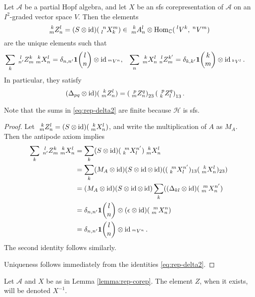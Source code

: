 \begin{Lem} \label{lemma:rep-corep} Let $\mathscr{A}$ be a partial Hopf algebra, and let $X$ be an sfs corepresentation of $\mathscr{A}$ on an $I^2$-graded vector space $V$.
  Then the elements %
  \[\Gr{Z}{k}{l}{m}{n} =(S \otimes
  \id)(\Gr{X}{n}{m}{l}{k}) \in
    \Gr{A}{k}{l}{m}{n} \otimes
    \Hom_\C(\Gru{V}{l}{k},\Gru{V}{n}{m})\] are the unique elements such  that
  \begin{align}\label{eq:rep-delta2}
    \sum_{k} \Gr{Z}{l}{k}{n'}{m} \Gr{X}{k}{l}{m}{n} &= \delta_{n,n'}
    \UnitC{l}{n} \otimes \id_{\Gru{V}{m}{n}}, &
    \sum_{n} \Gr{X}{k}{l}{m}{n} \Gr{Z}{l}{k'}{n}{m} &= \delta_{k,k'}
    \UnitC{k}{m}\otimes \id_{\Gru{V}{k}{l}}.
  \end{align}
   In particular, they satisfy
  \begin{align*}
    (\Delta_{pq} \otimes \id)(\Gr{Z}{k}{l}{m}{n}) &=
    \left(\Gr{Z}{p}{q}{m}{n}\right)_{23}\left(\Gr{Z}{p}{q}{k}{l}\right)_{13}.
  \end{align*}
\end{Lem}
Note that the sums in \eqref{eq:rep-delta2} are finite because $\mathcal{H}$ is sfs. 
\begin{proof}
 Let  $\Gr{Z}{k}{l}{m}{n}=(S \otimes \id)(\Gr{X}{k}{l}{m}{n})$, and write the multiplication of $A$ as $M_A$. Then the antipode axiom implies
   \begin{align*}
     \sum_{k} \Gr{Z}{l}{k}{n'}{m} \Gr{X}{k}{l}{m}{n} &= \sum_{k}
     (S\otimes \id)(\Gr{X}{m}{n'}{k}{l}) \Gr{X}{k}{l}{m}{n}
     \\
     &=\sum_{k} (M_A \otimes \id)(S\otimes \id \otimes \id) (
     (\Gr{X}{m}{n
       '}{k}{l})_{13}(\Gr{X}{k}{l}{m}{n})_{23}) \\
     &= (M_A\otimes \id)(S\otimes \id \otimes \id)\sum_{k}((\Delta_{kl}
     \otimes \id)(\Gr{X}{m}{n'}{m}{n}) \\
     &= \delta_{n,n'} \UnitC{l}{n}\otimes (\epsilon\otimes \id)(\Gr{X}{m}{n}{m}{n}) \\
     &= \delta_{n,n'}\UnitC{l}{n} \otimes 
     \id_{\Gru{V}{m}{n}}.
   \end{align*} The second identity follows
   similarly.

 Uniqueness follows immediately from the identities  \eqref{eq:rep-delta2}.
\end{proof}

\begin{Def} Let $\mathscr{A}$ and $X$ be as in Lemma \ref{lemma:rep-corep}. The element $Z$, when it exists, will be denoted $X^{-1}$.
\end{Def} 

